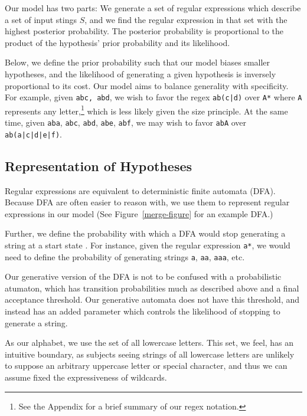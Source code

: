 \documentclass[10pt,letterpaper]{article}
\begin{document}
Our model has two parts: We generate a set of regular expressions which describe a set of input stings $S$, and we find the regular expression in that set with the highest posterior probability. The posterior probability is proportional to the product of the hypothesis' prior probability and its likelihood.

Below, we define the prior probability such that our model biases smaller hypotheses, and the likelihood of generating a given hypothesis is inversely proportional to its cost. Our model aims to balance generality with specificity. For example, given \verb!abc, abd!, we wish to favor the regex \verb!ab(c|d)! over \verb!A*! where \verb!A! represents any letter,\footnote{See the Appendix for a brief summary of our regex notation.} which is less likely given the size principle. At the same time, given \verb!aba!, \verb!abc!, \verb!abd!, \verb!abe!, \verb!abf!, we may wish to favor \verb!abA! over \verb!ab(a|c|d|e|f)!.

\subsection{Representation of Hypotheses}
Regular expressions are equivalent to deterministic finite automata (DFA). Because DFA are often easier to reason with, we use them to represent regular expressions in our model (See Figure~\ref{merge-figure} for an example DFA.)

Further, we define the probability with which a DFA would stop generating a string at a start state . For instance, given the regular expression \verb!a*!, we would need to define the probability of generating strings \verb!a!, \verb!aa!, \verb!aaa!, etc.

Our generative version of the DFA is not to be confused with a probabilistic atumaton, which has transition probabilities much as described above and a final acceptance threshold. Our generative automata does not have this threshold, and instead has an added parameter which controls the likelihood of stopping to generate a string.

As our alphabet, we use the set of all lowercase letters. This set, we feel, has an intuitive boundary, as subjects seeing strings of all lowercase letters are unlikely to suppose an arbitrary uppercase letter or special character, and thus we can assume fixed the expressiveness of wildcards.
\end{document}
